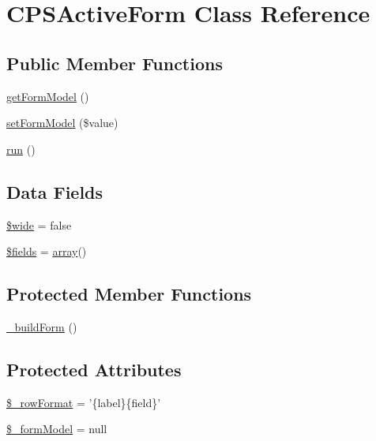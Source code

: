 \hypertarget{classCPSActiveForm}{
\section{CPSActiveForm Class Reference}
\label{classCPSActiveForm}
}
\subsection*{Public Member Functions}
\begin{DoxyCompactItemize}
\item 
\hyperlink{classCPSActiveForm_a150c51d4a39e86010c6dfe482ea5c36e}{getFormModel} ()
\item 
\hyperlink{classCPSActiveForm_a5e3cf96821d449b743d33f86129e64f3}{setFormModel} (\$value)
\item 
\hyperlink{classCPSActiveForm_afb0fafe7e02a3ae1993c01c19fad2bae}{run} ()
\end{DoxyCompactItemize}
\subsection*{Data Fields}
\begin{DoxyCompactItemize}
\item 
\hyperlink{classCPSActiveForm_a42782d08bb650a69d71220e69d387d85}{\$wide} = false
\item 
\hyperlink{classCPSActiveForm_ab2303c817e3b402b77b7f99627b9c319}{\$fields} = \hyperlink{list_8php_aa3205d038c7f8feb5c9f01ac4dfadc88}{array}()
\end{DoxyCompactItemize}
\subsection*{Protected Member Functions}
\begin{DoxyCompactItemize}
\item 
\hyperlink{classCPSActiveForm_aa324325c3a6613c52d0cabd29720774a}{\_\-buildForm} ()
\end{DoxyCompactItemize}
\subsection*{Protected Attributes}
\begin{DoxyCompactItemize}
\item 
\hyperlink{classCPSActiveForm_a9fb53050fa5baafba27e9adcd107eabc}{\$\_\-rowFormat} = '\{label\}\{field\}'
\item 
\hyperlink{classCPSActiveForm_aeef52661fba96c8837e968d42a97f088}{\$\_\-formModel} = null
\end{DoxyCompactItemize}


